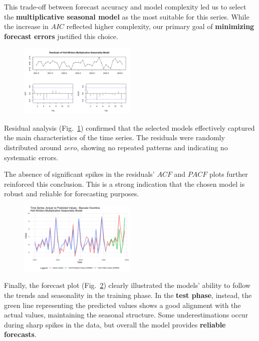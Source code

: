 \documentclass[10pt,twocolumn,letterpaper]{article}
\begin{document}
This trade-off between forecast accuracy and model complexity led us to select the \textbf{multiplicative seasonal model} as the most suitable for this series. While the increase in $AIC$ reflected higher complexity, our primary goal of \textbf{minimizing forecast errors} justified this choice.
\begin{figure}[h!]
    \centering
    \includegraphics[width=0.5\textwidth]{PlotsBEFD/Residuals_HWM_V.png} 
    \caption{}
    \label{fig:Residuals_HWM_V}
\end{figure}
Residual analysis (Fig.~\ref{fig:Residuals_HWM_V}) confirmed that the selected models effectively captured the main characteristics of the time series. The residuals were randomly distributed around $zero$, showing no repeated patterns and indicating no systematic errors. 

The absence of significant spikes in the residuals' $ACF$ and $PACF$ plots further reinforced this conclusion. This is a strong indication that the chosen model is robust and reliable for forecasting purposes.

\begin{figure}[h!]
    \centering
    \includegraphics[width=0.5\textwidth]{PlotsBEFD/TS_HWM_V.png} 
    \caption{}
    \label{fig:TS_HWM_V}
\end{figure}

Finally, the forecast plot (Fig.~\ref{fig:TS_HWM_V}) clearly illustrated the models' ability to follow the trends and seasonality in the training phase. In the \textbf{test phase}, instead, the green line representing the predicted values shows a good alignment with the actual values, maintaining the seasonal structure. Some underestimations occur during sharp spikes in the data, but overall the model provides \textbf{reliable forecasts}.
\end{document}
